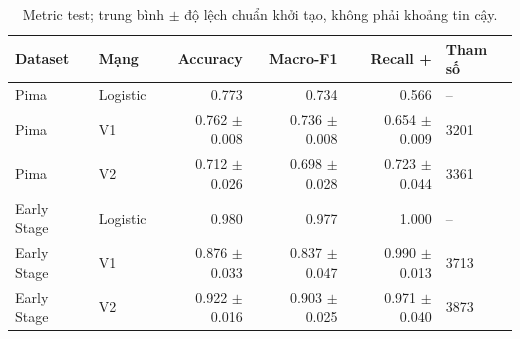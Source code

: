 \par\FloatBarrier\begin{table}[H]\centering\small{}\setlength{\tabcolsep}{5pt}
\caption{Metric test; trung bình $\pm$ độ lệch chuẩn khởi tạo, không phải khoảng tin cậy.}\begin{tabular}{llrrrl}\toprule
Dataset & Mạng & Accuracy & Macro-F1 & Recall + & Tham số\\\midrule
Pima & Logistic & 0.773 & 0.734 & 0.566 & --\\
Pima & V1 & 0.762 $\pm$ 0.008 & 0.736 $\pm$ 0.008 & 0.654 $\pm$ 0.009 & 3201\\
Pima & V2 & 0.712 $\pm$ 0.026 & 0.698 $\pm$ 0.028 & 0.723 $\pm$ 0.044 & 3361\\
Early Stage & Logistic & 0.980 & 0.977 & 1.000 & --\\
Early Stage & V1 & 0.876 $\pm$ 0.033 & 0.837 $\pm$ 0.047 & 0.990 $\pm$ 0.013 & 3713\\
Early Stage & V2 & 0.922 $\pm$ 0.016 & 0.903 $\pm$ 0.025 & 0.971 $\pm$ 0.040 & 3873\\\bottomrule\end{tabular}\end{table}
